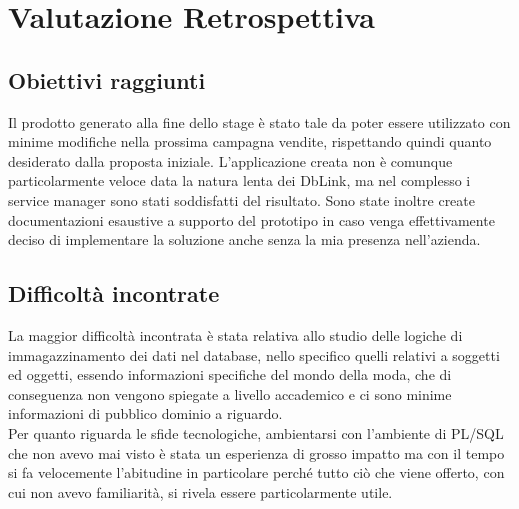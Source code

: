 \section{Valutazione Retrospettiva}
\subsection{Obiettivi raggiunti}
Il prodotto generato alla fine dello stage è stato tale da poter essere utilizzato con minime modifiche nella prossima campagna vendite, rispettando quindi quanto desiderato dalla proposta iniziale.
L'applicazione creata non è comunque particolarmente veloce data la natura lenta dei DbLink, ma nel complesso i service manager sono stati soddisfatti del risultato. Sono state inoltre create documentazioni esaustive a supporto del prototipo in caso venga effettivamente deciso di implementare la soluzione anche senza la mia presenza nell'azienda.\\

\subsection{Difficoltà incontrate}
La maggior difficoltà incontrata è stata relativa allo studio delle logiche di immagazzinamento dei dati nel database, nello specifico quelli relativi a soggetti ed oggetti, essendo informazioni specifiche del mondo della moda, che di conseguenza non vengono spiegate a livello accademico e ci sono minime informazioni di pubblico dominio a riguardo.\\
Per quanto riguarda le sfide tecnologiche, ambientarsi con l'ambiente di PL/SQL che non avevo mai visto è stata un esperienza di grosso impatto ma con il tempo si fa velocemente l'abitudine in particolare perché tutto ciò che viene offerto, con cui non avevo familiarità, si rivela essere particolarmente utile. 

